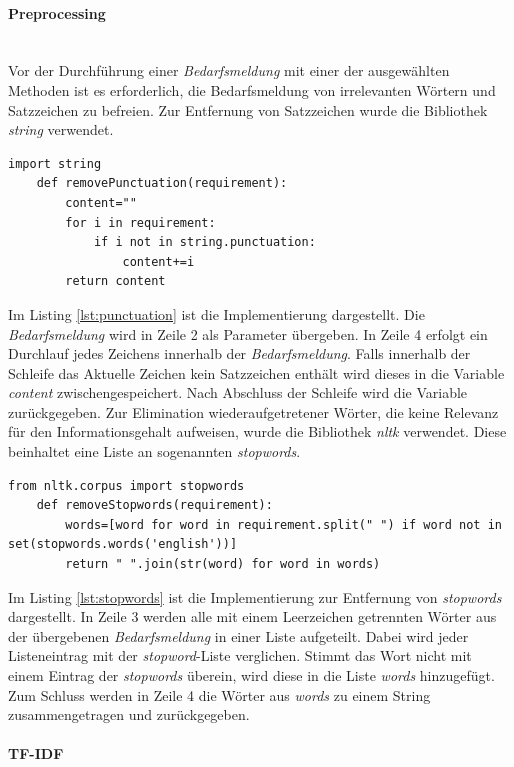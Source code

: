 \paragraph{Preprocessing}\mbox{}\\
Vor der Durchführung einer \emph{Bedarfsmeldung} mit einer der ausgewählten Methoden ist es erforderlich, die Bedarfsmeldung von irrelevanten Wörtern und Satzzeichen zu befreien. Zur Entfernung von Satzzeichen wurde die Bibliothek \emph{string} verwendet.
\begin{lstlisting}[caption={Implementation der Methode removePunctuation() des Moduls \emph{preprocessing.py}}, label=lst:punctuation]
	import string
	def removePunctuation(requirement):
		content=""
		for i in requirement: 
			if i not in string.punctuation:
				content+=i    
		return content
\end{lstlisting}
Im Listing \ref{lst:punctuation} ist die Implementierung dargestellt. Die \emph{Bedarfsmeldung} wird in Zeile 2 als Parameter übergeben. In Zeile 4 erfolgt ein Durchlauf jedes Zeichens innerhalb der \emph{Bedarfsmeldung}. Falls innerhalb der Schleife das Aktuelle Zeichen kein Satzzeichen enthält wird dieses in die Variable \emph{content} zwischengespeichert. Nach Abschluss der Schleife wird die Variable zurückgegeben. Zur Elimination wiederaufgetretener Wörter, die keine Relevanz für den Informationsgehalt aufweisen, wurde die Bibliothek \emph{nltk} verwendet. Diese beinhaltet eine Liste an sogenannten \emph{stopwords}.
\begin{lstlisting}[caption={Implementation der Methode removeStopwords() des Moduls \emph{preprocessing.py}}, label=lst:stopwords]
	from nltk.corpus import stopwords
	def removeStopwords(requirement):
		words=[word for word in requirement.split(" ") if word not in set(stopwords.words('english'))]
		return " ".join(str(word) for word in words)
\end{lstlisting}
Im Listing \ref{lst:stopwords} ist die Implementierung zur Entfernung von \emph{stopwords} dargestellt. In Zeile 3 werden alle mit einem Leerzeichen getrennten Wörter aus der übergebenen \emph{Bedarfsmeldung} in einer Liste aufgeteilt. Dabei wird jeder Listeneintrag mit der \emph{stopword}-Liste verglichen. Stimmt das Wort nicht mit einem Eintrag der \emph{stopwords} überein, wird diese in die Liste \emph{words} hinzugefügt. Zum Schluss werden in Zeile 4 die Wörter aus \emph{words} zu einem String zusammengetragen und zurückgegeben.
\paragraph{TF-IDF}\mbox{}\\

